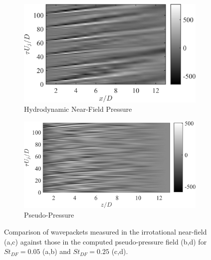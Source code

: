 \begin{figure}
	\centering
	\begin{subfigure}{.5\textwidth}
		\centering
		\includegraphics[width=0.95\linewidth]{Figures/ch5_St005_nearfield_wvpkts.png}
		\caption{Hydrodynamic Near-Field Pressure}
	\end{subfigure}%
	\begin{subfigure}{.5\textwidth}
		\centering
		\includegraphics[width=0.95\linewidth]{Figures/ch5_St005_flowfield_wvpkts.png}
		\caption{Pseudo-Pressure}
	\end{subfigure}
	\caption{Comparison of wavepackets measured in the irrotational near-field (a,c) against those in the computed pseudo-pressure field (b,d) for $St_{DF} = 0.05$ (a,b) and $St_{DF} = 0.25$ (c,d).}
	\label{fig:flowfield_wvpkts}
\end{figure}

